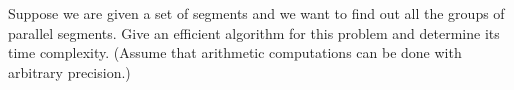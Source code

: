 Suppose we are given a set of segments and we want to find out all the
groups of parallel segments. Give an efficient algorithm for this
problem and determine its time complexity.  (Assume that arithmetic
computations can be done with arbitrary precision.)
